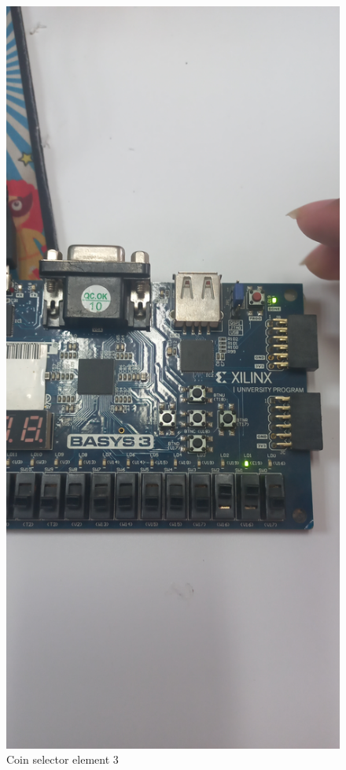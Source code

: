 \documentclass{article}
\begin{document}
\begin{multicols}{2}
	\begin{figure}[H]
		\centering
		\includegraphics[width=1\linewidth]{images/diagrams/coin-selector/coin-selector3.jpg}
		\caption{Coin selector element 3}
		\label{Coin selector element 3 Apendix}
	\end{figure}


\end{multicols}
\end{document}
